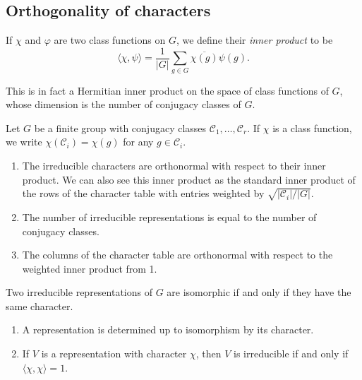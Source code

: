 \subsection{Orthogonality of characters}

\begin{definition}
    If $\chi$ and $\varphi$ are two class functions on $G$, we define their \emph{inner product} to be
    \[ \langle \chi, \psi \rangle = \frac{1}{\lvert G \rvert} \sum_{g \in G} \overline{\chi(g)} \psi(g). \]
\end{definition}

This is in fact a Hermitian inner product on the space of class functions of $G$, whose dimension is the number of conjugacy classes of $G$.

\begin{theorem}
    \label{the:orthonormal-characters}
    Let $G$ be a finite group with conjugacy classes $\mathcal C_1, \ldots, \mathcal C_r$. If $\chi$ is a class function, we write $\chi(\mathcal C_i) = \chi(g)$ for any $g \in \mathcal C_i$.
    \begin{enumerate}
        \item The irreducible characters are orthonormal with respect to their inner product. We can also see this inner product as the standard inner product of the rows of the character table with entries weighted by $\sqrt{\lvert \mathcal C_i \rvert/\lvert G \rvert}$.
        \item The number of irreducible representations is equal to the number of conjugacy classes.
        \item The columns of the character table are orthonormal with respect to the weighted inner product from 1.
    \end{enumerate}
\end{theorem}

\begin{theorem}
    Two irreducible representations of $G$ are isomorphic if and only if they have the same character.
\end{theorem}

\begin{theorem}
    \hspace{0em}
    \begin{enumerate}
        \item A representation is determined up to isomorphism by its character.
        \item If $V$ is a representation with character $\chi$, then $V$ is irreducible if and only if $\langle \chi, \chi \rangle = 1$.
    \end{enumerate}
\end{theorem}

